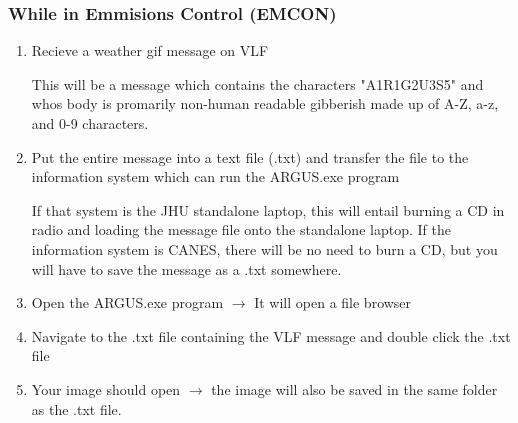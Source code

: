 \subsubsection{While in Emmisions Control (EMCON)}
\begin{enumerate}
    \item Recieve a weather gif message on VLF
    \begin{addnote} This will be a message which contains the characters "A1R1G2U3S5" and whos body is promarily non-human readable gibberish made up of A-Z, a-z, and 0-9 characters.\end{addnote}
    \item Put the entire message into a text file (.txt) and transfer the file to the information system which can run the ARGUS.exe program
    \begin{addnote} If that system is the JHU standalone laptop, this will entail burning a CD in radio and loading the message file onto the standalone laptop.  If the information system is CANES, there will be no need to burn a CD, but you will have to save the message as a .txt somewhere. \end{addnote}
    \item Open the ARGUS.exe program $\rightarrow$ It will open a file browser
    \item Navigate to the .txt file containing the VLF message and double click the .txt file
    \item Your image should open $\rightarrow$ the image will also be saved in the same folder as the .txt file.
\end{enumerate}

